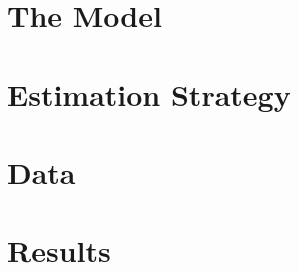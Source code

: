 \documentclass[12pt, a4paper]{article}
\begin{document}
\section{The Model}\label{sec_model}




\section{\label{sec_strat}Estimation Strategy}



\section{\label{sec_data}Data}



\section{\label{sec_res}Results}







\end{document}
